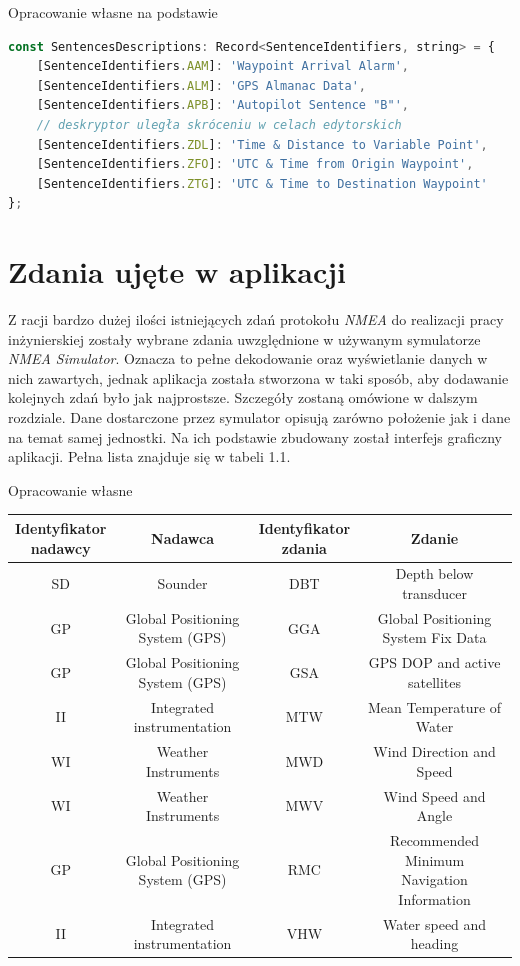 \documentclass[skorowidz,skroty]{dyplomWEZUT}
\begin{document}
{Opracowanie własne na podstawie \cite{gpsinformation, Raymond2019}}{\label{code: sentences descriptors}}
\begin{lstlisting}[language=JavaScript]
const SentencesDescriptions: Record<SentenceIdentifiers, string> = {
    [SentenceIdentifiers.AAM]: 'Waypoint Arrival Alarm',
    [SentenceIdentifiers.ALM]: 'GPS Almanac Data',
    [SentenceIdentifiers.APB]: 'Autopilot Sentence "B"',
    // deskryptor uległa skróceniu w celach edytorskich
    [SentenceIdentifiers.ZDL]: 'Time & Distance to Variable Point',
    [SentenceIdentifiers.ZFO]: 'UTC & Time from Origin Waypoint',
    [SentenceIdentifiers.ZTG]: 'UTC & Time to Destination Waypoint'
};
\end{lstlisting}

\section{Zdania ujęte w aplikacji}\label{sec:application sentences}
Z racji bardzo dużej ilości istniejących zdań protokołu \textit{NMEA} do realizacji pracy inżynierskiej zostały wybrane zdania uwzględnione w używanym symulatorze \textit{NMEA Simulator}. Oznacza to pełne dekodowanie oraz wyświetlanie danych w nich zawartych, jednak aplikacja została stworzona w taki sposób, aby dodawanie kolejnych zdań było jak najprostsze. Szczegóły zostaną omówione w dalszym rozdziale. Dane dostarczone przez symulator opisują zarówno położenie jak i dane na temat samej jednostki. Na ich podstawie zbudowany został interfejs graficzny aplikacji. Pełna lista znajduje się w tabeli 1.1.

{Opracowanie własne}
{\begin{tabular}{c|c|c|c}
\thead{Identyfikator \\ nadawcy} & Nadawca & \thead{Identyfikator \\ zdania} & Zdanie \\\hline\hline
SD & Sounder & DBT & Depth below transducer\\
\hline
GP & \makecell{Global Positioning \\ System (GPS)} & GGA & Global Positioning System Fix Data\\
\hline
GP & \makecell{Global Positioning \\ System (GPS)} & GSA & GPS DOP and active satellites\\
\hline
II & Integrated instrumentation & MTW & Mean Temperature of Water\\
\hline
WI & Weather Instruments & MWD & Wind Direction and Speed\\
\hline
WI & Weather Instruments & MWV &  Wind Speed and Angle\\
\hline
GP &\makecell{Global Positioning \\ System (GPS)} & RMC & \makecell{Recommended Minimum \\ Navigation Information}\\
\hline
II & Integrated instrumentation & VHW & Water speed and heading
\end{tabular}}
\end{document}
